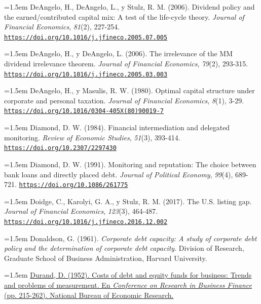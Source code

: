 \documentclass[10pt,a4paper]{article}
\begin{document}
\noindent\hangindent=1.5em DeAngelo, H., DeAngelo, L., y Stulz, R. M. (2006). Dividend policy and the earned/contributed capital mix: A test of the life-cycle theory. \textit{Journal of Financial Economics}, \textit{81}(2), 227-254. \href{https://doi.org/10.1016/j.jfineco.2005.07.005}{\nolinkurl{https://doi.org/10.1016/j.jfineco.2005.07.005}}

\noindent\hangindent=1.5em DeAngelo, H., y DeAngelo, L. (2006). The irrelevance of the MM dividend irrelevance theorem. \textit{Journal of Financial Economics}, \textit{79}(2), 293-315. \href{https://doi.org/10.1016/j.jfineco.2005.03.003}{\nolinkurl{https://doi.org/10.1016/j.jfineco.2005.03.003}}

\noindent\hangindent=1.5em DeAngelo, H., y Masulis, R. W. (1980). Optimal capital structure under corporate and personal taxation. \textit{Journal of Financial Economics}, \textit{8}(1), 3-29. \href{https://doi.org/10.1016/0304-405X(80)90019-7}{\nolinkurl{https://doi.org/10.1016/0304-405X(80)90019-7}}

\noindent\hangindent=1.5em Diamond, D. W. (1984). Financial intermediation and delegated monitoring. \textit{Review of Economic Studies}, \textit{51}(3), 393-414. \href{https://doi.org/10.2307/2297430}{\nolinkurl{https://doi.org/10.2307/2297430}}

\noindent\hangindent=1.5em Diamond, D. W. (1991). Monitoring and reputation: The choice between bank loans and directly placed debt. \textit{Journal of Political Economy}, \textit{99}(4), 689-721. \href{https://doi.org/10.1086/261775}{\nolinkurl{https://doi.org/10.1086/261775}}

\noindent\hangindent=1.5em Doidge, C., Karolyi, G. A., y Stulz, R. M. (2017). The U.S. listing gap. \textit{Journal of Financial Economics}, \textit{123}(3), 464-487. \href{https://doi.org/10.1016/j.jfineco.2016.12.002}{\nolinkurl{https://doi.org/10.1016/j.jfineco.2016.12.002}}

\noindent\hangindent=1.5em Donaldson, G. (1961). \textit{Corporate debt capacity: A study of corporate debt policy and the determination of corporate debt capacity}. Division of Research, Graduate School of Business Administration, Harvard University.

\noindent\hangindent=1.5em \href{https://www.nber.org/system/files/chapters/c4790/c4790.pdf}{Durand, D. (1952). Costs of debt and equity funds for business: Trends and problems of measurement. En \textit{Conference on Research in Business Finance} (pp. 215-262). National Bureau of Economic Research.}
\end{document}
